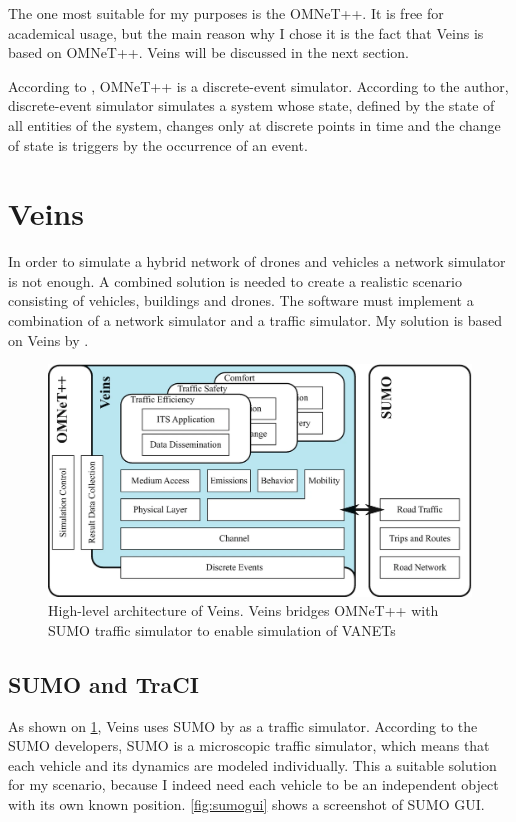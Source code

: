 \documentclass[]{nsm-thesis}
\begin{document}
The one most suitable for my purposes is the OMNeT++. It is free for academical usage, but the main reason why I chose it is the fact that Veins \cite{Sommer2019} is based on OMNeT++. Veins will be discussed in the next section.

According to \textcite[Page~2]{Varga2010}, OMNeT++ is a discrete-event simulator. According to the author, discrete-event simulator simulates a system whose state, defined by the state of all entities of the system, changes only at discrete points in time and the change of state is triggers by the occurrence of an event.

\section {Veins}

In order to simulate a hybrid network of drones and vehicles a network simulator is not enough. A combined solution is needed to create a realistic scenario consisting of vehicles, buildings and drones. The software must implement a combination of a network simulator and a traffic simulator. My solution is based on Veins by \textcite{Sommer2019}.

\begin{figure}
  	\centering
	\includegraphics[width=1\textwidth]{figures/High-level Veins.png}
	\caption{High-level architecture of Veins. Veins bridges OMNeT++ with SUMO traffic simulator to enable simulation of \acp{VANET} \cite{Sommer2019}}
	\label{fig:veinshighlevel}
\end{figure}

\subsection{SUMO and TraCI}
As shown on \ref{fig:veinshighlevel}, Veins uses SUMO by \textcite[Page~218]{sumo2018} as a traffic simulator. According to the SUMO developers, SUMO is a microscopic traffic simulator, which means that each vehicle and its dynamics are modeled individually.
This a suitable solution for my scenario, because I indeed need each vehicle to be an independent object with its own known position. \cref{fig:sumogui} shows a screenshot of SUMO \ac{GUI}.
\end{document}

